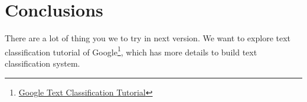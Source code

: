 \documentclass[11pt,a4paper]{article}
\begin{document}
\section{Conclusions}

There are a lot of thing you we to try in next version. We want to explore text classification tutorial of Google\footnote{\href{https://developers.google.com/machine-learning/guides/text-classification/}{Google Text Classification Tutorial}}, which has more details to build text classification system.



\end{document}
